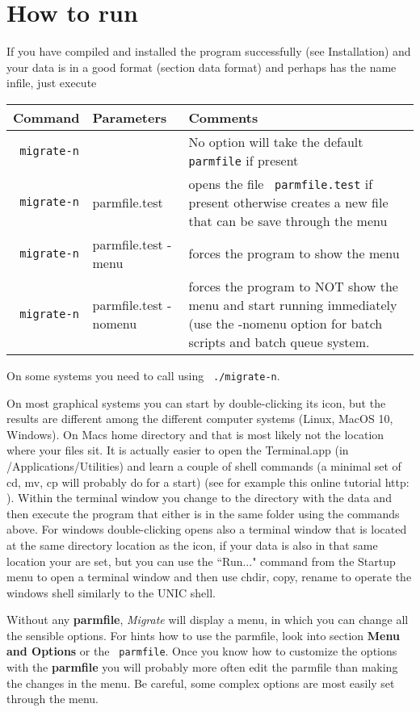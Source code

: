 \chapter{How to run \migrate}
If you have compiled and installed the program successfully (see Installation) and your data is in a good format (section data format) and perhaps has the name infile, just execute
\smallerskip
\begin{tabular}{l l p{10cm}}
Command & Parameters & Comments\\
\hline
\texttt{ migrate-n} &  & No option will take the default \texttt{ parmfile} if present\\
\texttt{ migrate-n} &  parmfile.test & opens the file \texttt{ parmfile.test} if present otherwise creates a new file that can be save through the menu\\
\texttt{ migrate-n} &  parmfile.test -menu & forces the program to show the menu\\
\texttt{ migrate-n} &  parmfile.test -nomenu & forces the program to NOT show the menu and start running immediately (use the -nomenu option for batch scripts and batch queue system.
\end{tabular}

On some systems you need to call \migrate using \texttt{ ./migrate-n}.

\smallerskip
On most graphical systems you can start \migrate by double-clicking its icon, but the results are different among the different computer systems (Linux, MacOS 10, Windows). On Macs home directory and that is most likely not the location where your files sit. It is actually easier to open the Terminal.app (in /Applications/Utilities) and 
learn a couple of shell commands (a minimal set of cd, mv, cp will probably do for a start) (see for example this online tutorial http: ). Within the terminal window you change to the directory with the data and then execute the program that either is in the same folder using the commands above. For windows double-clicking opens also a terminal window that is located at the same directory location as the icon, if your data is also in that same location your are set, but you can use the ``Run..." command from the Startup menu to open a terminal window and then use chdir, copy, rename to operate the windows shell similarly to the UNIC shell.

Without any \textbf{ parmfile}, \textit{ Migrate} will display a menu, in which you can change all the sensible options. For hints how to use the parmfile, look into section \textbf{ Menu and Options} or the \texttt{ parmfile}. Once you know how to customize the options with the \textbf{ parmfile} you will probably more often
edit the parmfile than making the changes in the menu. Be careful, some complex options are most easily set through the menu.




